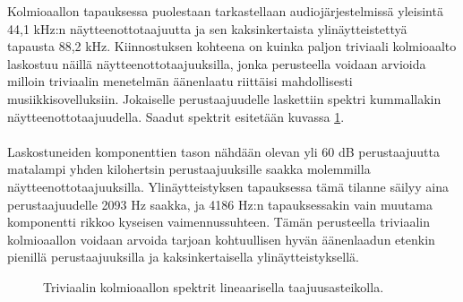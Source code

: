 \documentclass[finnish,12pt,a4paper,pdftex]{article} %
\begin{document}
Kolmioaallon tapauksessa puolestaan tarkastellaan audiojärjestelmissä yleisintä 44,1 kHz:n näytteenottotaajuutta ja sen kaksinkertaista ylinäytteistettyä tapausta 88,2 kHz. Kiinnostuksen kohteena on kuinka paljon triviaali kolmioaalto laskostuu näillä näytteenottotaajuuksilla, jonka perusteella voidaan arvioida milloin triviaalin menetelmän äänenlaatu riittäisi mahdollisesti musiikkisovelluksiin. Jokaiselle perustaajuudelle laskettiin spektri kummallakin näytteenottotaajuudella. Saadut spektrit esitetään kuvassa \ref{fig:kolmiosimulaatio}. \\\\
Laskostuneiden komponenttien tason nähdään olevan yli 60 dB perustaajuutta matalampi yhden kilohertsin perustaajuuksille saakka molemmilla näytteenottotaajuuksilla. Ylinäytteistyksen tapauksessa tämä tilanne säilyy aina perustaajuudelle 2093 Hz saakka, ja 4186 Hz:n tapauksessakin vain muutama komponentti rikkoo kyseisen vaimennussuhteen. Tämän perusteella triviaalin kolmioaallon voidaan arvoida tarjoan kohtuullisen hyvän äänenlaadun etenkin pienillä perustaajuuksilla ja kaksinkertaisella ylinäytteistyksellä. 
\begin{figure}[ht] 
\begin{center}
\caption{Triviaalin kolmioaallon spektrit lineaarisella taajuusasteikolla.}
\label{fig:kolmiosimulaatio}
\end{center}
\end{figure} 
\end{document}
